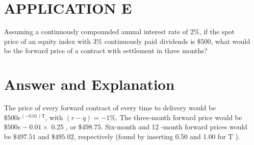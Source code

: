 \documentclass[11pt]{article}
\begin{document}
\section*{APPLICATION E}
Assuming a continuously compounded annual interest rate of $2 \%$, if the spot price of an equity index with $3 \%$ continuously paid dividends is $\$ 500$, what would be the forward price of a contract with settlement in three months?

\section*{Answer and Explanation}
The price of every forward contract of every time to delivery would be $\$ 500 e^{(-0.01) \mathrm{T}}$, with $(r-q)=-1 \%$. The three-month forward price would be $\$ 500 e-0.01 \times$ 0.25 , or $\$ 498.75$. Six-month and 12 -month forward prices would be $\$ 497.51$ and $\$ 495.02$, respectively (found by inserting 0.50 and 1.00 for $\mathrm{T}$ ).
\end{document}
